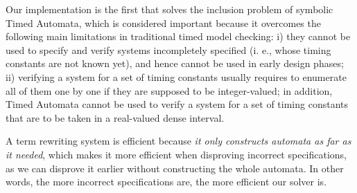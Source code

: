 \documentclass[acmsmall,10pt,review]{acmart}
\begin{document}
{Our implementation is the first that solves the  inclusion problem of symbolic Timed Automata, which is considered important because it overcomes the following main limitations in traditional timed model checking:  i) they cannot be used to specify and verify systems incompletely specified (i. e., whose timing constants are not known yet), and hence cannot be used in early design phases; ii) verifying a system for a set of timing constants usually requires to enumerate all of them one by one if they are supposed to be integer-valued; in addition, Timed Automata cannot be used to verify a system for a set of timing constants that are to be taken in a real-valued dense interval. 



A term rewriting system is efficient because \emph{it only constructs automata as far as it needed}, which makes it more efficient when disproving incorrect specifications, as we can disprove it earlier without constructing the whole automata. In other words, the more incorrect specifications are, the more efficient our solver is.

}
\end{document}
